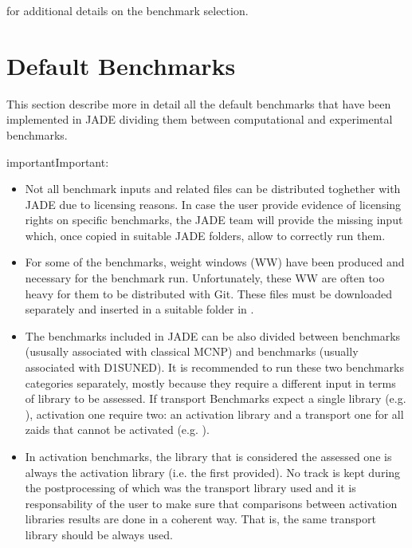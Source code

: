 \documentclass[letterpaper,10pt,english]{sphinxmanual}
\begin{document}


{\hyperref[\detokenize{usage/configuration:config}]{}} for additional details on the benchmark selection.




\chapter{Default Benchmarks}
\label{\detokenize{usage/benchmarks:default-benchmarks}}\label{\detokenize{usage/benchmarks::doc}}
This section describe more in detail all the default benchmarks
that have been implemented in JADE dividing them between
computational and experimental benchmarks.

\begin{sphinxadmonition}{important}{Important:}\begin{itemize}
\item {} 
Not all benchmark inputs and related files can be distributed
toghether with JADE due to licensing reasons. In case the user
provide evidence of licensing rights on specific benchmarks, the
JADE team will provide the missing input which, once copied
in suitable JADE folders, allow to correctly run them.

\item {} 
For some of the benchmarks, weight windows (WW) have been produced and
necessary for the benchmark run. Unfortunately, these WW are often too
heavy for them to be distributed with Git. These files must be downloaded
separately and inserted in a suitable folder in .

\item {} 
The benchmarks included in JADE can be also divided between
 benchmarks (ususally associated with classical
MCNP) and  benchmarks (usually associated with
D1S\sphinxhyphen{}UNED). It is recommended to run these two benchmarks
categories separately, mostly because they require a different
input in terms of library to be assessed. If transport Benchmarks
expect a single library (e.g. ), activation one require
two: an activation library and a transport one for all zaids that
cannot be activated (e.g. ).

\item {} 
In activation benchmarks, the library that is considered the assessed one
is always the activation library (i.e. the first provided). No track
is kept during the post\sphinxhyphen{}processing of which was the transport library used
and it is responsability of the user to make sure that comparisons between
activation libraries results are done in a coherent way. That is, the
same transport library should be always used.

\end{itemize}
\end{sphinxadmonition}
\end{document}
